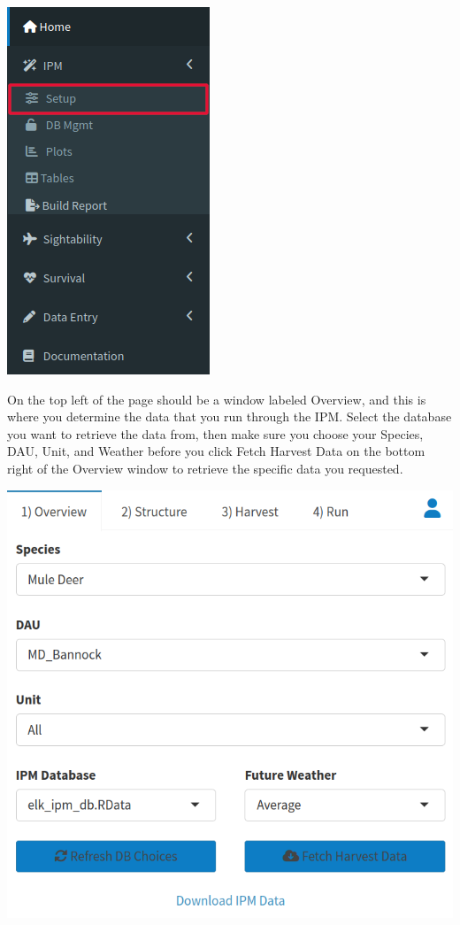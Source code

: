 \documentclass[
]{book}
\begin{document}
\includegraphics{./www/ipm_walk1.png}

On the top left of the page should be a window labeled Overview, and this is where you determine the data that you run through the IPM. Select the database you want to retrieve the data from, then make sure you choose your Species, {DAU}, Unit, and Weather before you click {Fetch Harvest Data} on the bottom right of the Overview window to retrieve the specific data you requested.

\includegraphics{./www/ipm_walk2.png}
\end{document}
